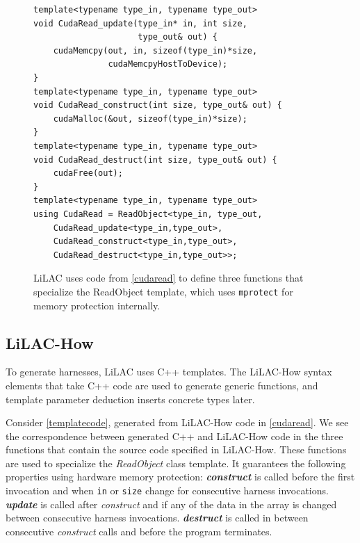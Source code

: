 \begin{figure}[p]
\begin{lstlisting}
template<typename type_in, typename type_out>
void CudaRead_update(type_in* in, int size,
                     type_out& out) {
    cudaMemcpy(out, in, sizeof(type_in)*size,
               cudaMemcpyHostToDevice);
}
template<typename type_in, typename type_out>
void CudaRead_construct(int size, type_out& out) {
    cudaMalloc(&out, sizeof(type_in)*size);
}
template<typename type_in, typename type_out>
void CudaRead_destruct(int size, type_out& out) {
    cudaFree(out);
}
template<typename type_in, typename type_out>
using CudaRead = ReadObject<type_in, type_out,
    CudaRead_update<type_in,type_out>,
    CudaRead_construct<type_in,type_out>,
    CudaRead_destruct<type_in,type_out>>;
\end{lstlisting}
\vspace{-0.5em}
\caption{LiLAC uses code from \autoref{cudaread} to define three functions that
         specialize the ReadObject template, which uses \texttt{mprotect} for
         memory protection internally.}
\label{templatecode}
\end{figure}

\subsection{LiLAC-How}
To generate harnesses, LiLAC uses C++ templates.
The LiLAC-How syntax elements that take C++ code are used to generate
generic functions, and template parameter deduction inserts concrete types later.

Consider \autoref{templatecode}, generated from LiLAC-How code in
\autoref{cudaread}.
We see the correspondence between generated C++ and
LiLAC-How code in the three functions that contain the source
code specified in LiLAC-How.
These functions are used to specialize the {\em ReadObject} class template.
It guarantees the following properties using hardware memory protection:
\linebreak
\noindent
{\bf {\em construct}} is called before the first invocation and when
\texttt{in} or \texttt{size} change for consecutive harness invocations.
\linebreak
\noindent
{\bf {\em update}} is called after {\em construct}
and if any of the data in the array is changed between
consecutive harness invocations.
\linebreak
\noindent
{\bf {\em destruct}} is called in between consecutive {\em construct}
calls and before the program terminates.


